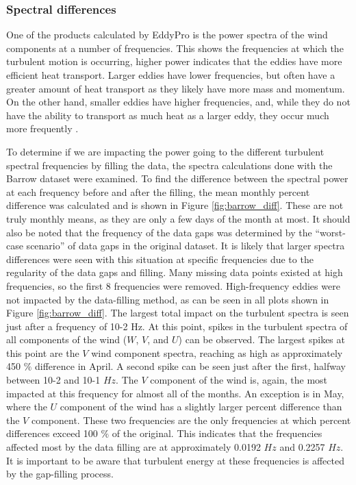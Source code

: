  \subsubsection{Spectral differences}
One of the products calculated by EddyPro is the power spectra of the wind components at a number of frequencies. This shows the frequencies at which the turbulent motion is occurring, higher power indicates that the eddies have more efficient heat transport. Larger eddies have lower frequencies, but often have a greater amount of heat transport as they likely have more mass and momentum. On the other hand, smaller eddies have higher frequencies, and, while they do not have the ability to transport as much heat as a larger eddy, they occur much more frequently \citep{cohen:2015}. 

To determine if we are impacting the power going to the different turbulent spectral frequencies by filling the data, the spectra calculations done with the Barrow dataset were examined. To find the difference between the spectral power at each frequency before and after the filling, the mean monthly percent difference was calculated and is shown in Figure \ref{fig:barrow_diff}. These are not truly monthly means, as they are only a few days of the month at most. It should also be noted that the frequency of the data gaps was determined by the “worst-case scenario” of data gaps in the original dataset. It is likely that larger spectra differences were seen with this situation at specific frequencies due to the regularity of the data gaps and filling. 
Many missing data points existed at high frequencies, so the first 8 frequencies were removed. High-frequency eddies were not impacted by the data-filling method, as can be seen in all plots shown in Figure \ref{fig:barrow_diff}. The largest total impact on the turbulent spectra is seen just after a frequency of 10-2 Hz. At this point, spikes in the turbulent spectra of all components of the wind ($W$, $V$, and $U$) can be observed. The largest spikes at this point are the $V$ wind component spectra, reaching as high as approximately 450 $\%$ difference in April. A second spike can be seen just after the first, halfway between 10-2 and 10-1 $Hz$. The $V$ component of the wind is, again, the most impacted at this frequency for almost all of the months. An exception is in May, where the $U$ component of the wind has a slightly larger percent difference than the $V$ component. These two frequencies are the only frequencies at which percent differences exceed 100 $\%$ of the original. This indicates that the frequencies affected most by the data filling are at approximately 0.0192 $Hz$ and 0.2257 $Hz$. It is important to be aware that turbulent energy at these frequencies is affected by the gap-filling process.

